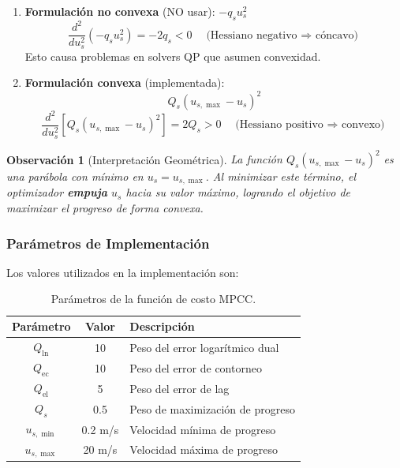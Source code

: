 \documentclass[11pt,a4paper]{article}
\newtheorem{remark}[theorem]{Observación}
\begin{document}
\begin{enumerate}
    \item \textbf{Formulación no convexa} (NO usar): $-q_s u_s^2$
    \begin{equation}
        \frac{d^2}{d u_s^2}\left(-q_s u_s^2\right) = -2 q_s < 0 \quad \text{(Hessiano negativo $\Rightarrow$ cóncavo)}
    \end{equation}
    Esto causa problemas en solvers QP que asumen convexidad.
    
    \item \textbf{Formulación convexa} (implementada):
    \begin{equation}
        \boxed{Q_s (u_{s,\max} - u_s)^2}
        \label{eq:convex_progress}
    \end{equation}
    \begin{equation}
        \frac{d^2}{d u_s^2}\left[Q_s (u_{s,\max} - u_s)^2\right] = 2 Q_s > 0 \quad \text{(Hessiano positivo $\Rightarrow$ convexo)}
    \end{equation}
\end{enumerate}

\begin{remark}[Interpretación Geométrica]
La función $Q_s(u_{s,\max} - u_s)^2$ es una parábola con mínimo en $u_s = u_{s,\max}$. Al minimizar este término, el optimizador \textbf{empuja} $u_s$ hacia su valor máximo, logrando el objetivo de maximizar el progreso de forma convexa.
\end{remark}

\subsubsection{Parámetros de Implementación}

Los valores utilizados en la implementación son:

\begin{table}[h]
\centering
\begin{tabular}{|c|c|l|}
\hline
\textbf{Parámetro} & \textbf{Valor} & \textbf{Descripción} \\
\hline
$Q_{\text{ln}}$ & 10 & Peso del error logarítmico dual \\
$Q_{\text{ec}}$ & 10 & Peso del error de contorneo \\
$Q_{\text{el}}$ & 5 & Peso del error de lag \\
$Q_s$ & 0.5 & Peso de maximización de progreso \\
$u_{s,\min}$ & 0.2 m/s & Velocidad mínima de progreso \\
$u_{s,\max}$ & 20 m/s & Velocidad máxima de progreso \\
\hline
\end{tabular}
\caption{Parámetros de la función de costo MPCC.}
\label{tab:cost_params}
\end{table}
\end{document}
